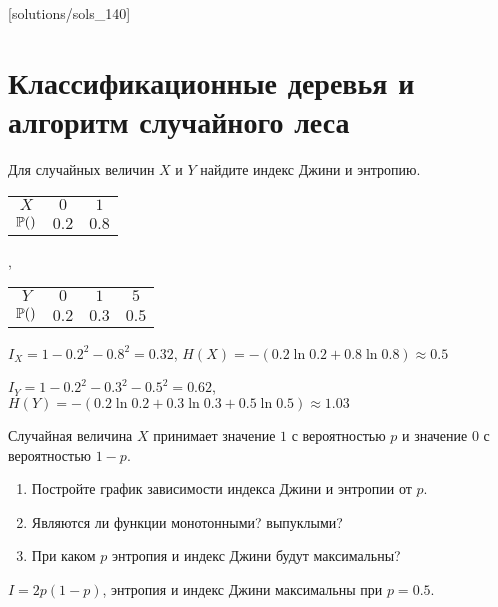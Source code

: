 [solutions/sols_140]

\chapter{Классификационные деревья и алгоритм случайного леса}


\begin{problem}
Для случайных величин  $X$ и $Y$ найдите индекс Джини и энтропию.


\begin{tabular}{ccc}
\toprule
$X$ & $0$ & $1$ \\
$\P()$ & $0.2$ & $0.8$ \\
\bottomrule
\end{tabular},
\begin{tabular}{cccc}
\toprule
$Y$ & $0$ & $1$ & $5$ \\
$\P()$ & $0.2$ & $0.3$ & $0.5$ \\
\bottomrule
\end{tabular}


\begin{sol}
$I_X = 1 - 0.2^2 - 0.8^2 = 0.32$, $H(X) = -(0.2 \ln 0.2 + 0.8 \ln 0.8) \approx 0.5$

$I_Y = 1 - 0.2^2 - 0.3^2 - 0.5^2 = 0.62$, $H(Y) = -(0.2 \ln 0.2 + 0.3 \ln 0.3 + 0.5 \ln 0.5) \approx 1.03$

\end{sol}
\end{problem}


\begin{problem}
Случайная величина $X$ принимает значение $1$ с вероятностью $p$ и значение $0$ с вероятностью $1-p$.
\begin{enumerate}
\item Постройте график зависимости индекса Джини и энтропии от $p$.
\item Являются ли функции монотонными? выпуклыми?
\item При каком $p$ энтропия и индекс Джини будут максимальны?
\end{enumerate}


\begin{sol}
$I = 2p(1-p)$, энтропия и индекс Джини максимальны при $p=0.5$.
\end{sol}
\end{problem}



